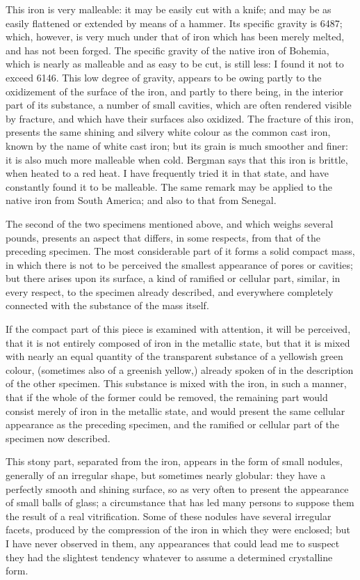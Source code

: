 \documentclass[a4paper, 12pt, oneside, twocolumn]{article}
\begin{document}
This iron is very malleable: it may be easily cut with a knife; and may be as easily flattened or extended by means of a hammer. Its specific gravity is 6487; which, however, is very much under that of iron which has been merely melted, and has not been forged. The specific gravity of the native iron of Bohemia, which is nearly as malleable and as easy to be cut, is still less: I found it not to exceed 6146. This low degree of gravity, appears to be owing partly to the oxidizement of the surface of the iron, and partly to there being, in the interior part of its substance, a number of small cavities, which are often rendered visible by fracture, and which have their surfaces also oxidized. The fracture of this iron, presents the same shining and silvery white colour as the common cast iron, known by the name of white cast iron; but its grain is much smoother and finer: it is also much more malleable when cold. Bergman says that this iron is brittle, when heated to a red heat. I have frequently tried it in that state, and have constantly found it to be malleable. The same remark may be applied to the native iron from South America; and also to that from Senegal.

The second of the two specimens mentioned above, and which weighs several pounds, presents an aspect that differs, in some respects, from that of the preceding specimen. The most considerable part of it forms a solid compact mass, in which there is not to be perceived the smallest appearance of pores or cavities; but there arises upon its surface, a kind of ramified or cellular part, similar, in every respect, to the specimen already described, and everywhere completely connected with the substance of the mass itself.

If the compact part of this piece is examined with attention, it will be perceived, that it is not entirely composed of iron in the metallic state, but that it is mixed with nearly an equal quantity of the transparent substance of a yellowish green colour, (sometimes also of a greenish yellow,) already spoken of in the description of the other specimen. This substance is mixed with the iron, in such a manner, that if the whole of the former could be removed, the remaining part would consist merely of iron in the metallic state, and would present the same cellular appearance as the preceding specimen, and the ramified or cellular part of the specimen now described.

This stony part, separated from the iron, appears in the form of small nodules, generally of an irregular shape, but sometimes nearly globular: they have a perfectly smooth and shining surface, so as very often to present the appearance of small balls of glass; a circumstance that has led many persons to suppose them the result of a real vitrification. Some of these nodules have several irregular facets, produced by the compression of the iron in which they were enclosed; but I have never observed in them, any appearances that could lead me to suspect they had the slightest tendency whatever to assume a determined crystalline form.
\end{document}

